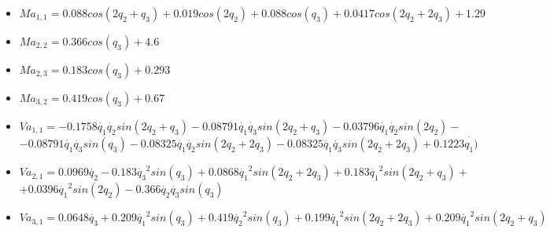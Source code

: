 \begin{itemize}
	\item $ Ma_{1,1}=0.088cos(2q_2 + q_3) + 0.019cos(2q_2) + 0.088cos(q_3) + 0.0417cos(2q_{2} + 2q_{3}) + 1.29$ \\ \vspace{0.2cm}
	\item $ Ma_{2,2}= 0.366cos(q_3) + 4.6$ \\ \vspace{0.2cm}
	\item $ Ma_{2,3}=0.183cos(q_3) + 0.293$ \\ \vspace{0.2cm}
	\item $ Ma_{3,2}=  0.419cos(q_3) + 0.67$ \\ \vspace{0.2cm}
	\item $ Va_{1,1}=-0.1758\dot{q_1}\dot{q_2}sin(2q_2 + q_3) - 0.08791\dot{q_1}\dot{q_3}sin(2q_2 + q_3) - 0.03796\dot{q_1}\dot{q_2}sin(2q_2) -$ \\ \vspace{0.1cm}
	 $ - 0.08791\dot{q_1}\dot{q_3}sin(q_3) - 0.08325\dot{q_1}\dot{q_2}sin(2q_2 + 2q_3) - 0.08325\dot{q_1}\dot{q_3}sin(2q_2 + 2q_3) + 0.1223\dot{q_1)}$ \\ \vspace{0.2cm}
	 \item $ Va_{2,1}=0.0969\dot{q_2} - 0.183\dot{q_3}^{2}sin(q_3) + 0.0868\dot{q_1}^{2}sin(2q_{2} + 2q_{3}) + 0.183\dot{q_1}^{2}sin(2q_2 + q_3) + $ \\ \vspace{0.1cm}
	 $ + 0.0396\dot{q_1}^{2}sin(2q_{2}) - 0.366\dot{q_2}\dot{q_3}sin(q_3) $\\ \vspace{0.2cm}
	 \item $ Va_{3,1}=0.0648\dot{q_3} + 0.209\dot{q_1}^{2}sin(q_3) + 0.419\dot{q_2}^{2}sin(q_3) + 0.199\dot{q_1}^{2}sin(2q_2 + 2q_3) + 0.209\dot{q_1}^{2}sin(2q_2 + q_3) $
\end{itemize}

\newpage
